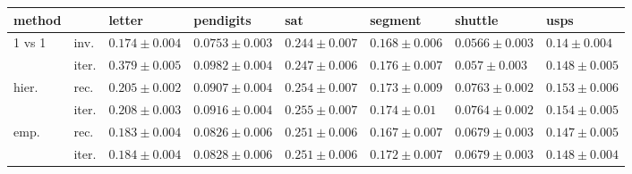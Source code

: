 \begin{table}
{\small
\begin{tabular}{|ll|llllll|}
\hline
 method & & letter & pendigits & sat & segment & shuttle & usps\\
\hline\hline
1 vs 1 & inv. & $0.174 \pm 0.004 $ & $0.0753 \pm 0.003 $ & $0.244 \pm 0.007 $ & $0.168 \pm 0.006 $ & $0.0566 \pm 0.003 $ & $0.14 \pm 0.004 $ \\
 & iter. & $0.379 \pm 0.005 $ & $0.0982 \pm 0.004 $ & $0.247 \pm 0.006 $ & $0.176 \pm 0.007 $ & $0.057 \pm 0.003 $ & $0.148 \pm 0.005 $ \\
hier. & rec. & $0.205 \pm 0.002 $ & $0.0907 \pm 0.004 $ & $0.254 \pm 0.007 $ & $0.173 \pm 0.009 $ & $0.0763 \pm 0.002 $ & $0.153 \pm 0.006 $ \\
 & iter. & $0.208 \pm 0.003 $ & $0.0916 \pm 0.004 $ & $0.255 \pm 0.007 $ & $0.174 \pm 0.01 $ & $0.0764 \pm 0.002 $ & $0.154 \pm 0.005 $ \\
emp. & rec. & $0.183 \pm 0.004 $ & $0.0826 \pm 0.006 $ & $0.251 \pm 0.006 $ & $0.167 \pm 0.007 $ & $0.0679 \pm 0.003 $ & $0.147 \pm 0.005 $ \\
 & iter. & $0.184 \pm 0.004 $ & $0.0828 \pm 0.006 $ & $0.251 \pm 0.006 $ & $0.172 \pm 0.007 $ & $0.0679 \pm 0.003 $ & $0.148 \pm 0.004 $ \\
\hline
\end{tabular}
}
\end{table}

